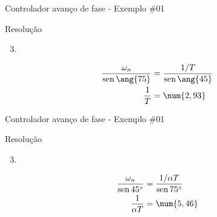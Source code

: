 \begin{frame}{Controlador avanço de fase - Exemplo \#01}
\begin{block}{Resolução}
\begin{enumerate}
	\setcounter{enumi}{2}
	\item 
\end{enumerate}
\begin{minipage}{0.5\linewidth}
	\centering
	
	\scalebox{0.8}{}
\end{minipage}
\hfill
\begin{minipage}{0.4\linewidth}
	\centering
	
	\scalebox{0.8}{}
	
	\vspace{-0.5cm}
	\begin{align*}
	\dfrac{\omega_n}{\sen\ang{75}}&=\dfrac{1/T}{\sen\ang{45}}\\
	\dfrac{1}{T}&=\num{2,93}
	\end{align*}
\end{minipage}
\end{block}
\end{frame}


\begin{frame}{Controlador avanço de fase - Exemplo \#01}
\begin{block}{Resolução}
	\begin{enumerate}
	\setcounter{enumi}{2}
	\item 
\end{enumerate}
\begin{minipage}{0.5\linewidth}
	\centering
	
	\scalebox{0.8}{}
\end{minipage}
\hfill
\begin{minipage}{0.4\linewidth}
	\centering
	
	\scalebox{0.7}{}
	
	\vspace{-0.5cm}
	\begin{align*}
	\dfrac{\omega_n}{\sen45^{\circ}}&=\dfrac{1/\alpha T}{\sen75^{\circ}}\\
	\dfrac{1}{\alpha T}&=\num{5,46}
	\end{align*}
\end{minipage}
\end{block}
\end{frame}


